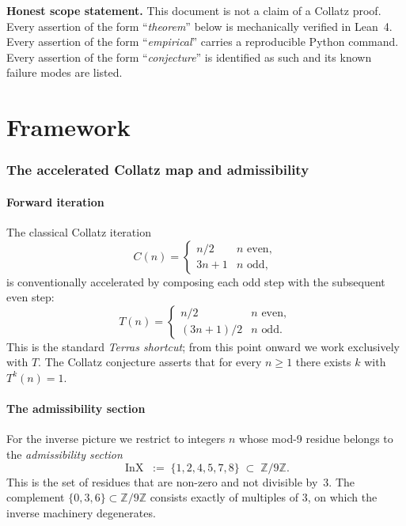 \documentclass[11pt,a4paper]{article}
\theoremstyle{plain}
\theoremstyle{definition}
\newcommand{\ZZ}{\mathbb{Z}}
\DeclareMathOperator{\InX}{InX}
\begin{document}
\bigskip\noindent
\textbf{Honest scope statement.} This document is not a claim of a
Collatz proof. Every assertion of the form ``\emph{theorem}'' below
is mechanically verified in Lean~4. Every assertion of the form
``\emph{empirical}'' carries a reproducible Python command. Every
assertion of the form ``\emph{conjecture}'' is identified as such
and its known failure modes are listed.

\newpage

\part{Framework}\label{part:framework}

\section{The accelerated Collatz map and admissibility}\label{sec:framework}

\subsection{Forward iteration}

The classical Collatz iteration
\[
   C(n) = \begin{cases} n/2 & n \text{ even}, \\ 3n+1 & n \text{ odd}, \end{cases}
\]
is conventionally accelerated by composing each odd step with the
subsequent even step:
\[
  T(n) = \begin{cases}
     n/2 & n \text{ even}, \\
     (3n + 1)/2 & n \text{ odd}.
  \end{cases}
\]
This is the standard \emph{Terras shortcut}; from this point onward
we work exclusively with $T$. The Collatz conjecture asserts that
for every $n \ge 1$ there exists $k$ with $T^k(n) = 1$.

\subsection{The admissibility section}

For the inverse picture we restrict to integers $n$ whose mod-9
residue belongs to the \emph{admissibility section}
\[
  \InX \;:=\; \{1, 2, 4, 5, 7, 8\} \;\subset\; \ZZ/9\ZZ.
\]
This is the set of residues that are non-zero and not divisible
by~$3$. The complement
$\{0, 3, 6\} \subset \ZZ/9\ZZ$ consists exactly of multiples of
$3$, on which the inverse machinery degenerates.
\end{document}
